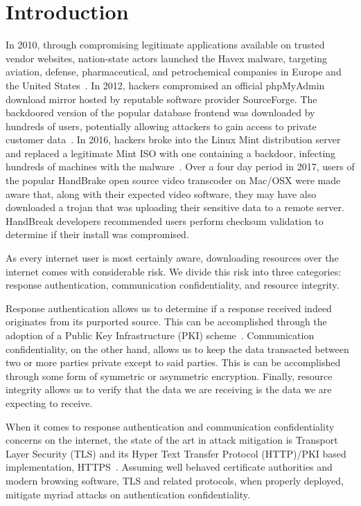 \section{Introduction} \label{sec:introduction}


In 2010, through compromising legitimate applications available on trusted
vendor websites, nation-state actors launched the Havex malware, targeting
aviation, defense, pharmaceutical, and petrochemical companies in Europe and the
United States~\cite{SCA-HAVEX}. In 2012, hackers compromised an official
phpMyAdmin download mirror hosted by reputable software provider SourceForge.
The backdoored version of the popular database frontend was downloaded by
hundreds of users, potentially allowing attackers to gain access to private
customer data~\cite{SCA-PMA}. In 2016, hackers broke into the Linux Mint
distribution server and replaced a legitimate Mint ISO with one containing a
backdoor, infecting hundreds of machines with the malware~\cite{SCA-MINT1,
SCA-MINT2}. Over a four day period in 2017, users of the popular HandBrake open
source video transcoder on Mac/OSX were made aware that, along with their
expected video software, they may have also downloaded a trojan that was
uploading their sensitive data to a remote server. HandBreak developers
recommended users perform checksum validation to determine if their install was
compromised.

As every internet user is most certainly aware, downloading resources over the
internet comes with considerable risk. We divide this risk into three
categories: response authentication, communication confidentiality, and resource
integrity.

Response authentication allows us to determine if a response received indeed
originates from its purported source. This can be accomplished through the
adoption of a Public Key Infrastructure (PKI) scheme~\cite{PKI}. Communication
confidentiality, on the other hand, allows us to keep the data transacted
between two or more parties private except to said parties. This is can be
accomplished through some form of symmetric or asymmetric encryption. Finally,
resource integrity allows us to verify that the data we are receiving is the
data we are expecting to receive.


When it comes to response authentication and communication confidentiality
concerns on the internet, the state of the art in attack mitigation is Transport
Layer Security (TLS) and its Hyper Text Transfer Protocol (HTTP)/PKI based
implementation, HTTPS~\cite{TLS1.2, TLS1, TLS0, HTTPS, PKI}. Assuming well
behaved certificate authorities and modern browsing software, TLS and related
protocols, when properly deployed, mitigate myriad attacks on authentication
confidentiality.

